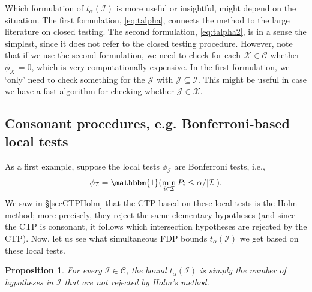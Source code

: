 \documentclass[11pt]{article}
\theoremstyle{plain}
\newtheorem{proposition}[theorem]{Proposition}
\theoremstyle{definition}
\newcommand{\K}{\mathcal{K}}
\newcommand{\I}{\mathcal{I}}
\newcommand{\J}{\mathcal{J}}
\newcommand{\X}{\mathcal{X}}
\newcommand{\C}{\mathcal{C}}
\begin{document}
Which formulation of $t_{\alpha}(\I)$ is more useful or insightful, might depend on the situation. The first formulation, \eqref{eq:talpha}, connects the method to the large literature on closed testing. The second formulation, \eqref{eq:talpha2},  is in a sense the simplest, since it does not refer to the closed testing procedure. However, note that if we  use  the second formulation, we need to check for each $\K\in \C$ whether $\phi_{\K}=0$, which is very computationally expensive. In the first formulation, we  `only' need to check something for the $\J$ with $\J \subseteq \I$. This might be useful  in case we have a fast algorithm for checking whether $\J\in \X$. 






\subsection{Consonant procedures, e.g. Bonferroni-based local tests} \label{secexBonftalpha}
As a first example, suppose the local tests $\phi_{\I}$ are Bonferroni tests, i.e., 
\begin{equation}\label{localtBonf}
\phi_{\I} = \mathbbm{1}( \min_{i\in \I}P_i\leq \alpha/|\I|).
\end{equation}
We saw in \S\ref{secCTPHolm} that the CTP  based on these local tests is the Holm method; more precisely, they reject the same elementary hypotheses (and since the CTP is consonant, it follows which intersection hypotheses are rejected by the CTP).
Now, let us see what simultaneous FDP bounds $t_{\alpha}(\I)$ we get based on these local tests.


\begin{proposition} \label{proptalphaisHolm}
For every $\I\in \C$, the bound $t_{\alpha}(\I)$ is simply the number of  hypotheses in $\I$ that are not rejected by Holm's method.
\end{proposition}
\end{document}
